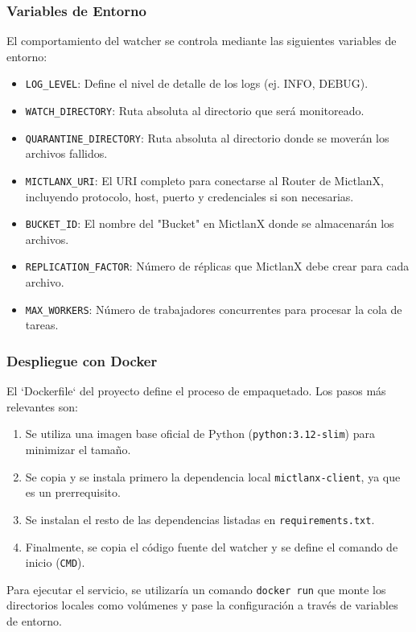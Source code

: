\subsubsection{Variables de Entorno}
El comportamiento del watcher se controla mediante las siguientes variables de entorno:
\begin{itemize}
    \item \texttt{LOG\_LEVEL}: Define el nivel de detalle de los logs (ej. INFO, DEBUG).
    \item \texttt{WATCH\_DIRECTORY}: Ruta absoluta al directorio que será monitoreado.
    \item \texttt{QUARANTINE\_DIRECTORY}: Ruta absoluta al directorio donde se moverán los archivos fallidos.
    \item \texttt{MICTLANX\_URI}: El URI completo para conectarse al Router de MictlanX, incluyendo protocolo, host, puerto y credenciales si son necesarias.
    \item \texttt{BUCKET\_ID}: El nombre del "Bucket" en MictlanX donde se almacenarán los archivos.
    \item \texttt{REPLICATION\_FACTOR}: Número de réplicas que MictlanX debe crear para cada archivo.
    \item \texttt{MAX\_WORKERS}: Número de trabajadores concurrentes para procesar la cola de tareas.
\end{itemize}

\subsubsection{Despliegue con Docker}
El `Dockerfile` del proyecto define el proceso de empaquetado. Los pasos más relevantes son:
\begin{enumerate}
    \item Se utiliza una imagen base oficial de Python (\texttt{python:3.12-slim}) para minimizar el tamaño.
    \item Se copia y se instala primero la dependencia local \texttt{mictlanx-client}, ya que es un prerrequisito.
    \item Se instalan el resto de las dependencias listadas en \texttt{requirements.txt}.
    \item Finalmente, se copia el código fuente del watcher y se define el comando de inicio (\texttt{CMD}).
\end{enumerate}
Para ejecutar el servicio, se utilizaría un comando \texttt{docker run} que monte los directorios locales como volúmenes y pase la configuración a través de variables de entorno.

